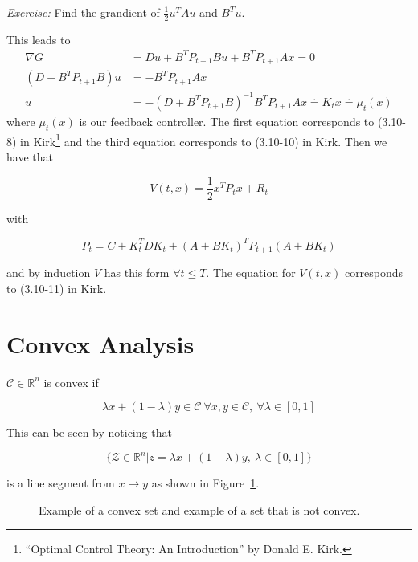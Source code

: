 \textit{Exercise:} Find the grandient of $\frac{1}{2}u^T Au$ and $B^T u$.

This leads to
\begin{align*}
\nabla G &= Du + B^T P_{t+1}Bu + B^T P_{t+1}Ax = 0 \\
(D+B^T P_{t+1}B)u &= -B^T P_{t+1}Ax \\
u &= -{(D+B^T P_{t+1}B)}^{-1}B^T P_{t+1}Ax \doteq K_t x \doteq \mu_t(x)
\end{align*}
where $\mu_t(x)$ is our feedback controller.
The first equation corresponds to (3.10-8) in Kirk\footnote{``Optimal Control Theory: An Introduction'' by Donald E. Kirk.} and the third equation corresponds to (3.10-10) in Kirk.%
Then we have that

\begin{equation*}
V(t,x) = \frac{1}{2}x^T P_t x + R_t
\end{equation*}

with

\begin{equation*}
P_t = C+ K_t^T DK_t + {(A+BK_t)}^T P_{t+1} (A+BK_t)
\end{equation*}

and by induction $V$ has this form $\forall t\leq T$.
The equation for $V(t,x)$ corresponds to (3.10-11) in Kirk.%

\section{Convex Analysis}
\begin{definition}
$\mathcal{C}\in\mathbb{R}^n$ is convex if

\begin{equation*}
\lambda x + (1-\lambda)y \in \mathcal{C}~\forall x,y\in\mathcal{C},~\forall \lambda\in[0,1]
\end{equation*}

This can be seen by noticing that

\begin{equation*}
\{\mathcal{Z}\in\mathbb{R}^n | z=\lambda x+(1-\lambda)y,~\lambda\in[0,1]\}
\end{equation*}

is a line segment from $x\to y$ as shown in Figure~\ref{fig:05convex}.
\end{definition}

\begin{figure}[ht!]
\centering
{} \hfill
{}
\caption{\protect{} Example of a convex set and \protect{} example of a set that is not convex.}%
\label{fig:05convex}
\end{figure}

